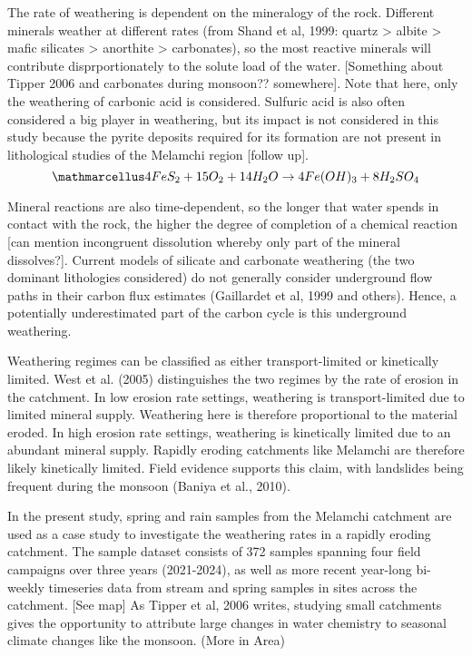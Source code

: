 \begin{tcolorbox}
{\begin{center}
    \end{center}

The rate of weathering is dependent on the mineralogy of the rock. Different minerals weather at different rates (from Shand et al, 1999: quartz > albite > mafic silicates > anorthite > carbonates), so the most reactive minerals will contribute disprportionately to the solute load of the water. [Something about Tipper 2006 and carbonates during monsoon?? somewhere]. Note that here, only the weathering of carbonic acid is considered. Sulfuric acid is also often considered a big player in weathering, but its impact is not considered in this study because the pyrite deposits required for its formation are not present in lithological studies of the Melamchi region [follow up].
\[
\ttmath{4FeS_2 + 15O_2 + 14H_2O \rightarrow 4Fe(OH)_3 + 8H_2SO_4}
\] 

Mineral reactions are also time-dependent, so the longer that water spends in contact with the rock, the higher the degree of completion of a chemical reaction [can mention incongruent dissolution whereby only part of the mineral dissolves?]. Current models of silicate and carbonate weathering (the two dominant lithologies considered) do not generally consider underground flow paths in their carbon flux estimates (Gaillardet et al, 1999 and others). Hence, a potentially underestimated part of the carbon cycle is this underground weathering.

}
\end{tcolorbox}


\newpage

Weathering regimes can be classified as either transport-limited or kinetically limited. West et al. (2005) distinguishes the two regimes by the rate of erosion in the catchment. In low erosion rate settings, weathering is transport-limited due to limited mineral supply. Weathering here is therefore proportional to the material eroded. In high erosion rate settings, weathering is kinetically limited due to an abundant mineral supply. Rapidly eroding catchments like Melamchi are therefore likely kinetically limited. Field evidence supports this claim, with landslides being frequent during the monsoon (Baniya et al., 2010).


\bsk



In the present study, spring and rain samples from the Melamchi catchment are used as a case 
study to investigate the weathering rates in a rapidly eroding catchment. The sample dataset consists of 372 samples spanning four field campaigns over three years (2021-2024), as well as more recent year-long bi-weekly timeseries data from stream and spring samples in sites across the catchment. [See map] 
As Tipper et al, 2006 writes, studying small catchments gives the opportunity to attribute large changes in water chemistry to seasonal climate changes like the monsoon. (More in Area)


